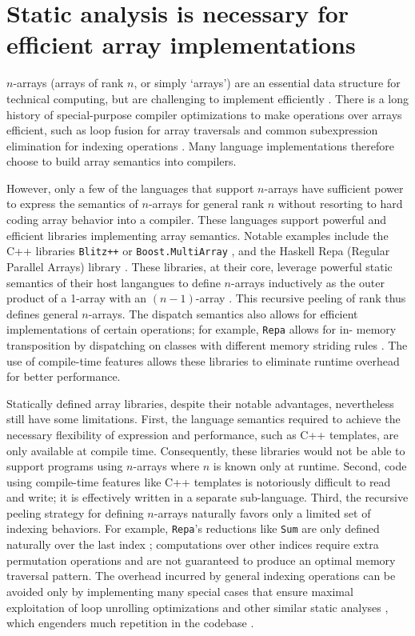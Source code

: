 \documentclass[preprint]{sigplanconf}
\newcommand{\code}[1]{\texttt{#1}}
\begin{document}
\section{Static analysis is necessary for efficient array implementations}

$n$-arrays (arrays of rank $n$, or simply `arrays') are an essential data
structure for technical computing, but are challenging to implement
efficiently \cite{Sattley:1960as,Sattley:1961as, Randell:1964a6}. There is a
long history of special-purpose compiler optimizations to make operations over
arrays efficient, such as loop fusion for array traversals and common
subexpression elimination for indexing operations \cite{Randell:1964a6,
Busam:1969oe}. Many language implementations therefore choose to build array
semantics into compilers.

However, only a few of the languages that support $n$-arrays have sufficient
power to express the semantics of $n$-arrays for general rank $n$ without
resorting to hard coding array behavior into a compiler.
These languages support powerful and efficient libraries
implementing array semantics. Notable examples  include the C++ libraries
\code{Blitz++} \cite{Veldhuizen:1998ab} or \code{Boost.MultiArray}
\cite{Garcia:2005ma}, and the Haskell Repa (Regular Parallel Arrays) library
\cite{Keller:2010rs,Lippmeier:2011ep, Lippmeier:2012gp}. These libraries, at
their core, leverage powerful static semantics of their host langangues to
define $n$-arrays inductively as the outer product of a 1-array with an
$(n-1)$-array \cite{Bavestrelli:2000ct}. This recursive peeling of rank thus
defines general $n$-arrays. The dispatch semantics also allows for efficient
implementations of certain operations; for example, \code{Repa} allows for in-
memory transposition by dispatching on classes with different memory striding
rules \cite{Keller:2010rs}. The use of compile-time features allows these
libraries to eliminate runtime overhead for better performance.

Statically defined array libraries, despite their notable advantages,
nevertheless still have some limitations. First, the language semantics
required to achieve the necessary flexibility of expression and performance,
such as C++ templates, are only available at compile time.
Consequently, these libraries would not be able to support programs using
$n$-arrays where $n$ is known only at runtime.
Second, code using compile-time features like C++ templates is
notoriously difficult to read and write; it is effectively written in a
separate sub-language.
Third, the recursive peeling strategy for defining $n$-arrays
naturally favors only a limited set of indexing behaviors. For example,
\code{Repa}'s reductions like \code{Sum} are only defined naturally over the
last index \cite{Keller:2010rs}; computations over other indices require extra
permutation operations and are not guaranteed to produce an optimal memory
traversal pattern. The overhead incurred by general indexing operations can be
avoided only by implementing many special cases that ensure maximal
exploitation of loop unrolling optimizations and other similar static analyses
\cite{Garcia:2005ma, Lippmeier:2011ep}, which engenders much repetition in the
codebase \cite{Lippmeier:2012gp}.
\end{document}
